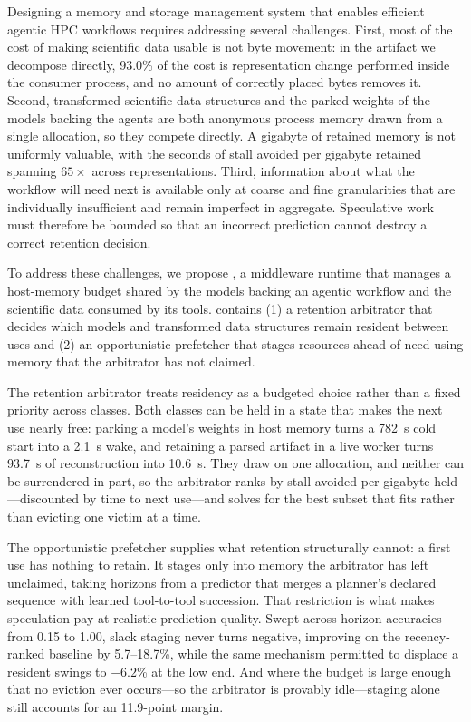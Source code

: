 Designing a memory and storage management system that enables efficient
agentic HPC workflows requires addressing several challenges. First, most of
the cost of making scientific data usable is not byte movement: in the
artifact we decompose directly, 93.0\% of the cost is representation change
performed inside the consumer process, and no amount of correctly placed bytes
removes it. Second, transformed scientific data structures and the parked
weights of the models backing the agents are both anonymous process memory
drawn from a single allocation, so they compete directly. A gigabyte of
retained memory is not uniformly valuable, with the seconds of stall avoided
per gigabyte retained spanning $65\times$ across representations. Third,
information about what the workflow will need next is available only at coarse
and fine granularities that are individually insufficient and remain imperfect
in aggregate. Speculative work must therefore be bounded so that an incorrect
prediction cannot destroy a correct retention decision.

To address these challenges, we propose \sysname, a middleware runtime that
manages a host-memory budget shared by the models backing an agentic workflow
and the scientific data consumed by its tools. \sysname{} contains (1) a
retention arbitrator that decides which models and transformed data structures
remain resident between uses and (2) an opportunistic prefetcher that stages
resources ahead of need using memory that the arbitrator has not claimed.

The retention arbitrator treats residency as a budgeted choice rather than a
fixed priority across classes. Both classes can be held in a state that makes
the next use nearly free: parking a model's weights in host memory turns a
782~s cold start into a 2.1~s wake, and retaining a parsed artifact in a live
worker turns 93.7~s of reconstruction into 10.6~s. They draw on one
allocation, and neither can be surrendered in part, so the arbitrator ranks by
stall avoided per gigabyte held---discounted by time to next use---and solves
for the best subset that fits rather than evicting one victim at a time.

The opportunistic prefetcher supplies what retention structurally cannot: a
first use has nothing to retain. It stages only into memory the arbitrator has
left unclaimed, taking horizons from a predictor that merges a planner's
declared sequence with learned tool-to-tool succession. That restriction is
what makes speculation pay at realistic prediction quality. Swept across
horizon accuracies from 0.15 to 1.00, slack staging never turns negative,
improving on the recency-ranked baseline by 5.7--18.7\%, while the same
mechanism permitted to displace a resident swings to $-6.2$\% at the low end.
And where the budget is large enough that no eviction ever occurs---so the
arbitrator is provably idle---staging alone still accounts for an 11.9-point
margin.


